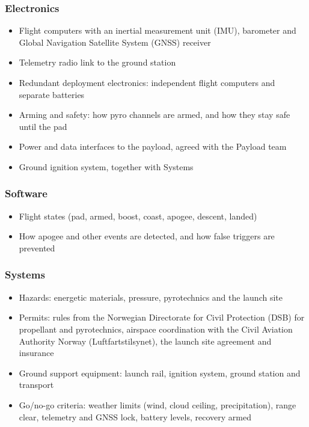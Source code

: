 \documentclass{../../Common/Latex/Templates/rapport}
\begin{document}
\subsubsection*{Electronics}
\begin{itemize}
  \item Flight computers with an inertial measurement unit (IMU), barometer and Global Navigation Satellite System (GNSS) receiver
  \item Telemetry radio link to the ground station
  \item Redundant deployment electronics: independent flight computers and separate batteries
  \item Arming and safety: how pyro channels are armed, and how they stay safe until the pad
  \item Power and data interfaces to the payload, agreed with the Payload team
  \item Ground ignition system, together with Systems
\end{itemize}

\subsubsection*{Software}
\begin{itemize}
  \item Flight states (pad, armed, boost, coast, apogee, descent, landed)
  \item How apogee and other events are detected, and how false triggers are prevented
\end{itemize}

\subsubsection*{Systems}
\begin{itemize}
  \item Hazards: energetic materials, pressure, pyrotechnics and the launch site
  \item Permits: rules from the Norwegian Directorate for Civil Protection (DSB) for propellant and pyrotechnics, airspace coordination with the Civil Aviation Authority Norway (Luftfartstilsynet), the launch site agreement and insurance
  \item Ground support equipment: launch rail, ignition system, ground station and transport
  \item Go/no-go criteria: weather limits (wind, cloud ceiling, precipitation), range clear, telemetry and GNSS lock, battery levels, recovery armed
\end{itemize}
\end{document}
